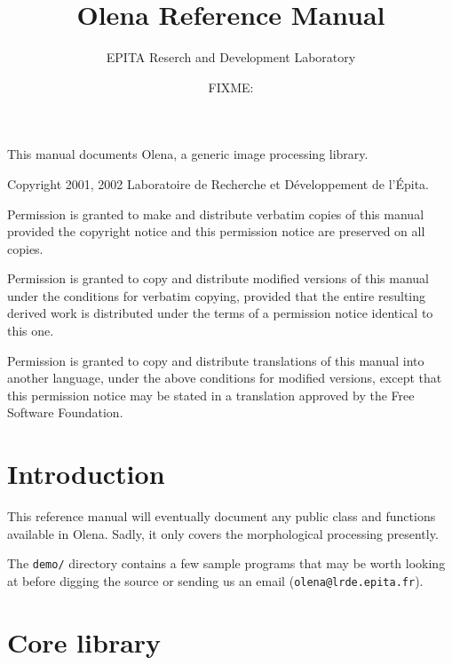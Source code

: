 \documentclass{book}
\newcommand\var\textit
\begin{document}
\lstset{language=C++}

\title{Olena Reference Manual}
\author{EPITA Reserch and Development Laboratory}
\date{FIXME:}
\maketitle


This manual documents Olena, a generic image processing library.

Copyright 2001, 2002  Laboratoire de Recherche et D\'eveloppement de l'\'Epita.

Permission is granted to make and distribute verbatim
copies of this manual provided the copyright notice and
this permission notice are preserved on all copies.


Permission is granted to copy and distribute modified versions of this
manual under the conditions for verbatim copying, provided that the
entire resulting derived work is distributed under the terms of a
permission notice identical to this one.

Permission is granted to copy and distribute
translations of this manual into another language,
under the above conditions for modified versions,
except that this permission notice may be stated in a
translation approved by the Free Software Foundation.

\newpage

\chapter{Introduction}

This reference manual will eventually document any public class and
functions available in Olena.  Sadly, it only covers the morphological
processing presently.

The \texttt{demo/} directory contains a few sample programs that may be
worth looking at before digging the source or sending us an email
(\texttt{olena@lrde.epita.fr}).


\chapter{Core library}
\end{document}
